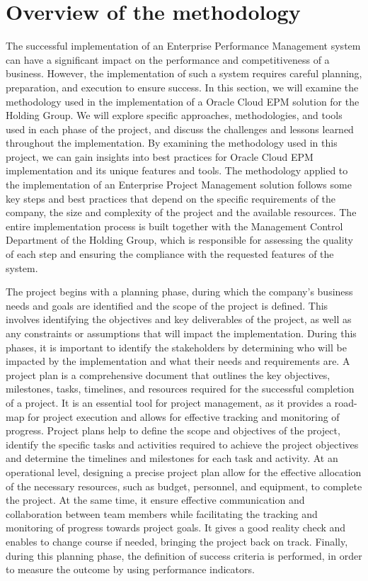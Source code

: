 \documentclass[12pt,a4paper,openright,twoside]{book}
\begin{document}
\section{Overview of the methodology}

The successful implementation of an Enterprise Performance Management system can have a significant impact on the performance and competitiveness of a business. 
%
However, the implementation of such a system requires careful planning, preparation, and execution to ensure success. 
%
In this section, we will examine the methodology used in the implementation of a Oracle Cloud EPM solution for the Holding Group.
%
We will explore specific approaches, methodologies, and tools used in each phase of the project, and discuss the challenges and lessons learned throughout the implementation. 
%
By examining the methodology used in this project, we can gain insights into best practices for Oracle Cloud EPM implementation and its unique features and tools.
%
The methodology applied to the implementation of an Enterprise Project Management solution follows some key steps and best practices that depend on the specific requirements of the company, the size and complexity of the project and the available resources.
%
The entire implementation process is built together with the Management Control Department of the Holding Group, which is responsible for assessing the quality of each step and ensuring the compliance with the requested features of the system.

The project begins with a planning phase, during which the company's business needs and goals are identified and the scope of the project is defined.
%
This involves identifying the objectives and key deliverables of the project, as well as any constraints or assumptions that will impact the implementation.
%
During this phases, it is important to identify the stakeholders by determining who will be impacted by the implementation and what their needs and requirements are.
%
A project plan is a comprehensive document that outlines the key objectives, milestones, tasks, timelines, and resources required for the successful completion of a project. 
%
It is an essential tool for project management, as it provides a road-map for project execution and allows for effective tracking and monitoring of progress.
%
Project plans help to define the scope and objectives of the project, identify the specific tasks and activities required to achieve the project objectives and determine the timelines and milestones for each task and activity.
%
At an operational level, designing a precise project plan allow for the effective allocation of the necessary resources, such as budget, personnel, and equipment, to complete the project.
%
At the same time, it ensure effective communication and collaboration between team members while facilitating the tracking and monitoring of progress towards project goals.
%
It gives a good reality check and enables to change course if needed, bringing the project back on track. 
%
Finally, during this planning phase, the definition of success criteria is performed, in order to measure the outcome by using performance indicators.
\end{document}
